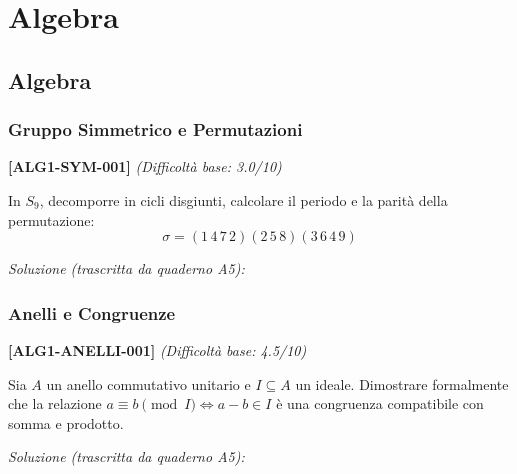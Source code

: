 \documentclass[11pt,a4paper]{book}
\newenvironment{esercizio}[2]{%
  \par\medskip\noindent\textbf{[#1]} \textit{(Difficoltà base: #2/10)}\par\noindent\ignorespaces
}{\par\medskip}
\newenvironment{soluzione}{%
  \par\noindent\textit{Soluzione (trascritta da quaderno A5):}\par\noindent\ignorespaces
}{\par\bigskip}
\begin{document}
\part{Algebra}

\chapter{Algebra}

\section{Gruppo Simmetrico e Permutazioni}

\begin{esercizio}{ALG1-SYM-001}{3.0}
In $S_9$, decomporre in cicli disgiunti, calcolare il periodo e la parità della permutazione:
$$\sigma = (1\,4\,7\,2)(2\,5\,8)(3\,6\,4\,9)$$
\end{esercizio}
\begin{soluzione}
\end{soluzione}

\section{Anelli e Congruenze}

\begin{esercizio}{ALG1-ANELLI-001}{4.5}
Sia $A$ un anello commutativo unitario e $I \subseteq A$ un ideale. Dimostrare formalmente che la relazione $a \equiv b \pmod{I} \iff a - b \in I$ è una congruenza compatibile con somma e prodotto.
\end{esercizio}
\begin{soluzione}
\end{soluzione}
\end{document}
